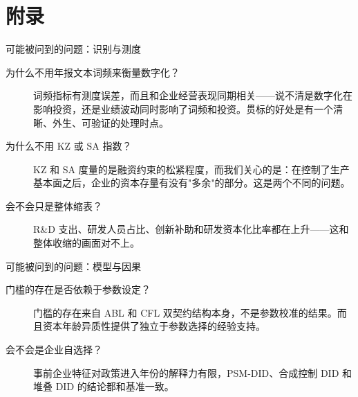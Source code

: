 \section{附录}

\begin{frame}{可能被问到的问题：识别与测度}
  \begin{description}
    \item[为什么不用年报文本词频来衡量数字化？] 词频指标有测度误差，而且和企业经营表现同期相关——说不清是数字化在影响投资，还是业绩波动同时影响了词频和投资。贯标的好处是有一个清晰、外生、可验证的处理时点。
    \item[为什么不用 KZ 或 SA 指数？] KZ 和 SA 度量的是融资约束的松紧程度，而我们关心的是：在控制了生产基本面之后，企业的资本存量有没有"多余"的部分。这是两个不同的问题。
    \item[会不会只是整体缩表？] R\&D 支出、研发人员占比、创新补助和研发资本化比率都在上升——这和整体收缩的画面对不上。
  \end{description}
\end{frame}

\begin{frame}{可能被问到的问题：模型与因果}
  \begin{description}
    \item[门槛的存在是否依赖于参数设定？] 门槛的存在来自 ABL 和 CFL 双契约结构本身，不是参数校准的结果。而且资本年龄异质性提供了独立于参数选择的经验支持。
    \item[会不会是企业自选择？] 事前企业特征对政策进入年份的解释力有限，PSM-DID、合成控制 DID 和堆叠 DID 的结论都和基准一致。
  \end{description}
\end{frame}
